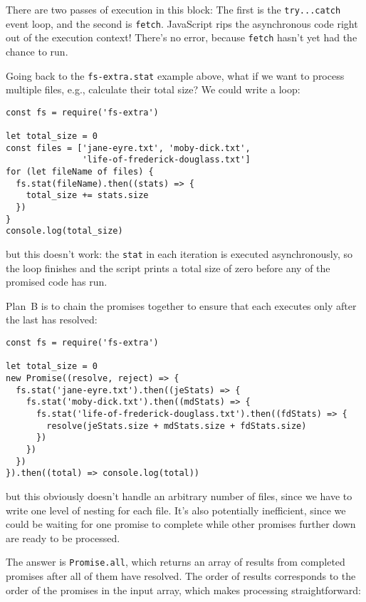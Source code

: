 
There are two passes of execution in this block:
The first is the \texttt{try...catch} event loop,
and the second is \texttt{fetch}.
JavaScript rips the asynchronous code right out of the execution context!
There's no error, because \texttt{fetch} hasn't yet had the chance to run.

Going back to the \texttt{fs-extra.stat} example above,
what if we want to process multiple files,
e.g.,
calculate their total size?
We could write a loop:

\begin{verbatim}
const fs = require('fs-extra')

let total_size = 0
const files = ['jane-eyre.txt', 'moby-dick.txt',
               'life-of-frederick-douglass.txt']
for (let fileName of files) {
  fs.stat(fileName).then((stats) => {
    total_size += stats.size
  })
}
console.log(total_size)
\end{verbatim}

\noindent
but this doesn't work:
the \texttt{stat} in each iteration is executed asynchronously,
so the loop finishes and the script prints a total size of zero
before any of the promised code has run.

Plan~B is to chain the promises together
to ensure that each executes only after the last has resolved:

\begin{verbatim}
const fs = require('fs-extra')

let total_size = 0
new Promise((resolve, reject) => {
  fs.stat('jane-eyre.txt').then((jeStats) => {
    fs.stat('moby-dick.txt').then((mdStats) => {
      fs.stat('life-of-frederick-douglass.txt').then((fdStats) => {
        resolve(jeStats.size + mdStats.size + fdStats.size)
      })
    })
  })
}).then((total) => console.log(total))
\end{verbatim}

\noindent
but this obviously doesn't handle an arbitrary number of files,
since we have to write one level of nesting for each file.
It's also potentially inefficient,
since we could be waiting for one promise to complete
while other promises further down are ready to be processed.

The answer is \texttt{Promise.all},
which returns an array of results from completed promises after all of them have resolved.
The order of results corresponds to the order of the promises in the input array,
which makes processing straightforward:


